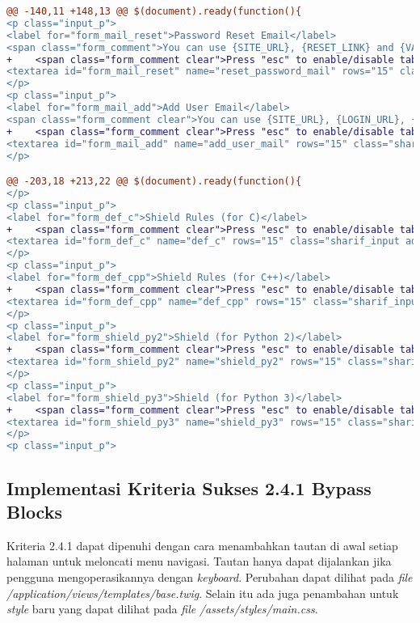 \begin{lstlisting}[language=diff, caption=Perubahan untuk mematuhi kriteria 2.1.2, label=lst_2.1.2, basicstyle=\ttfamily, frame=single,
columns=fullflexible, keepspaces=true, breaklines=true]
@@ -140,11 +148,13 @@ $(document).ready(function(){
<p class="input_p">
<label for="form_mail_reset">Password Reset Email</label>
<span class="form_comment">You can use {SITE_URL}, {RESET_LINK} and {VALID_TIME}</span><br>
+    <span class="form_comment clear">Press "esc" to enable/disable tabindent</span><br>
<textarea id="form_mail_reset" name="reset_password_mail" rows="15" class="sharif_input add_text clear">{{ reset_password_mail }}</textarea>
</p>
<p class="input_p">
<label for="form_mail_add">Add User Email</label>
<span class="form_comment clear">You can use {SITE_URL}, {LOGIN_URL}, {ROLE}, {USERNAME} and {PASSWORD}</span><br>
+    <span class="form_comment clear">Press "esc" to enable/disable tabindent</span><br>
<textarea id="form_mail_add" name="add_user_mail" rows="15" class="sharif_input add_text clear">{{ add_user_mail }}</textarea>
</p>

@@ -203,18 +213,22 @@ $(document).ready(function(){
</p>
<p class="input_p">
<label for="form_def_c">Shield Rules (for C)</label>
+    <span class="form_comment clear">Press "esc" to enable/disable tabindent</span><br>
<textarea id="form_def_c" name="def_c" rows="15" class="sharif_input add_text clear">{{ defc }}</textarea>
</p>
<p class="input_p">
<label for="form_def_cpp">Shield Rules (for C++)</label>
+    <span class="form_comment clear">Press "esc" to enable/disable tabindent</span><br>
<textarea id="form_def_cpp" name="def_cpp" rows="15" class="sharif_input add_text clear">{{ defcpp }}</textarea>
</p>
<p class="input_p">
<label for="form_shield_py2">Shield (for Python 2)</label>
+    <span class="form_comment clear">Press "esc" to enable/disable tabindent</span><br>
<textarea id="form_shield_py2" name="shield_py2" rows="15" class="sharif_input add_text clear">{{ shield_py2 }}</textarea>
</p>
<p class="input_p">
<label for="form_shield_py3">Shield (for Python 3)</label>
+    <span class="form_comment clear">Press "esc" to enable/disable tabindent</span><br>
<textarea id="form_shield_py3" name="shield_py3" rows="15" class="sharif_input add_text clear">{{ shield_py3 }}</textarea>
</p>
<p class="input_p">
\end{lstlisting}

\subsection{Implementasi Kriteria Sukses 2.4.1 Bypass Blocks}
\label{subsec:implementasi_A_2.4.1}

Kriteria 2.4.1 dapat dipenuhi dengan cara menambahkan tautan di awal setiap halaman untuk meloncati menu navigasi. Tautan hanya dapat dijalankan jika pengguna mengoperasikannya dengan \textit{keyboard}. Perubahan dapat dilihat pada \textit{file} \textit{/application/views/templates/base.twig}. Selain itu ada juga penambahan untuk \textit{style} baru yang dapat dilihat pada \textit{file} \textit{/assets/styles/main.css}.

